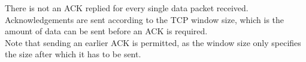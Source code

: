 There is not an ACK replied for every single data packet received.\\
Acknowledgements are sent according to the TCP window size, which is the amount of data can be sent before an ACK is required.\\
Note that sending an earlier ACK is permitted, as the window size only specifies the size after which it has to be sent.